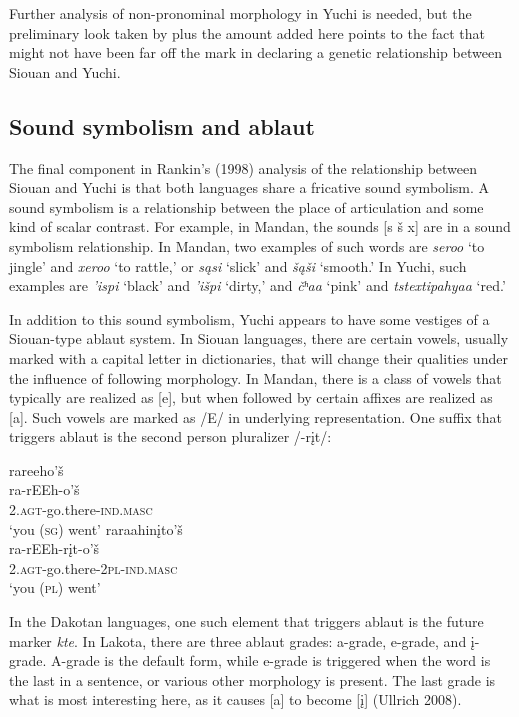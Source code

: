 \documentclass[output=paper]{LSP/langsci}
\begin{document}
Further analysis of non-pronominal morphology in Yuchi is needed, but the preliminary look taken by \citet{Rankin1998} plus the amount added here points to the fact that \citet{Sapir1929} might not have been far off the mark in declaring a genetic relationship between Siouan and Yuchi.

\subsection{Sound symbolism and ablaut}

The final component in Rankin's (1998) analysis of the relationship between Siouan and Yuchi is that both languages share a fricative sound symbolism. A sound symbolism is a relationship between the place of articulation and some kind of scalar contrast. For example, in Mandan, the sounds [s \v{s} x] are in a sound symbolism relationship. In Mandan, two examples of such words are \emph{seroo} `to jingle' and \emph{xeroo} `to rattle,' or \emph{s\k{a}si} `slick' and \emph{\v{s}\k{a}\v{s}i} `smooth.' In Yuchi, such examples are \emph{'ispi} `black' and \emph{'i\v{s}pi} `dirty,' and \emph{\v{c}ʰa\textbeltl a} `pink' and \emph{tstextipa{\super h}ya\textbeltl a} `red.'

In addition to this sound symbolism, Yuchi appears to have some vestiges of a Siouan-type ablaut system. In Siouan languages, there are certain vowels, usually marked with a capital letter in dictionaries, that will change their qualities under the influence of following morphology. In Mandan, there is a class of vowels that typically are realized as [e], but when followed by certain affixes are realized as [a]. Such vowels are marked as /E/ in underlying representation. One suffix that triggers ablaut is the second person pluralizer /-r\k{i}t/:

\ea
	\ea 
	\glll rareeho'\v{s} \\
	ra-rEEh-o'\v{s} \\	
	\textsc{2.agt}-go.there-\textsc{ind.masc} \\
	\glt	`you (\textsc{sg}) went'
	\ex 
	\glll raraahin\k{i}to'\v{s}\\
	ra-rEEh-r\k{i}t-o'\v{s}\\	
	\textsc{2.agt}-go.there-\textsc{2pl-ind.masc}\\
	\glt	`you (\textsc{pl}) went'
	\z
\z

In the Dakotan languages, one such element that triggers ablaut is the future marker \emph{kte}. In Lakota, there are three ablaut grades: a-grade, e-grade, and \k{i}-grade. A-grade is the default form, while e-grade is triggered when the word is the last in a sentence, or various other morphology is present. The last grade is what is most interesting here, as it causes [a] to become [\k{i}] (Ullrich 2008).
\end{document}
